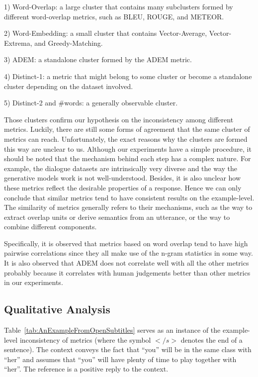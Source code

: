 \documentclass[conference]{IEEEtran}
\begin{document}
1) Word-Overlap: a large cluster that contains many subclusters formed by different word-overlap metrics, such as BLEU, ROUGE, and METEOR.

2) Word-Embedding: a small cluster that contains Vector-Average, Vector-Extrema, and Greedy-Matching.

3) ADEM: a standalone cluster formed by the ADEM metric.

4) Distinct-1: a metric that might belong to some cluster or become a standalone cluster depending on the dataset involved.

5) Distinct-2 and \#words: a generally observable cluster.

Those clusters confirm our hypothesis on the inconsistency among different metrics.
Luckily, there are still some forms of agreement that the same cluster of metrics can reach.
Unfortunately, the exact reasons why the clusters are formed this way are unclear to us.
Although our experiments have a simple procedure, it should be noted that the mechanism behind each step has a complex nature.
For example, the dialogue datasets are intrinsically very diverse and the way the generative models work is not well-understood.
Besides, it is also unclear how these metrics reflect the desirable properties of a response.
Hence we can only conclude that similar metrics tend to have consistent results on the example-level.
The similarity of metrics generally refers to their mechanisms, such as the way to extract overlap units or derive semantics from an utterance, or the way to combine different components.

Specifically, it is observed that metrics based on word overlap tend to have high pairwise correlations since they all make use of the n-gram statistics in some way.
It is also observed that ADEM does not correlate well with all the other metrics probably because it correlates with human judgements better than other metrics in our experiments.

\subsection{Qualitative Analysis}

Table~\ref{tab:AnExampleFromOpenSubtitles} serves as an instance of the example-level inconsistency of metrics (where the symbol $</s>$ denotes the end of a sentence).
The context conveys the fact that ``you'' will be in the same class with ``her''
and assumes that ``you'' will have plenty of time to play together with ``her''.
The reference is a positive reply to the context.
\end{document}
